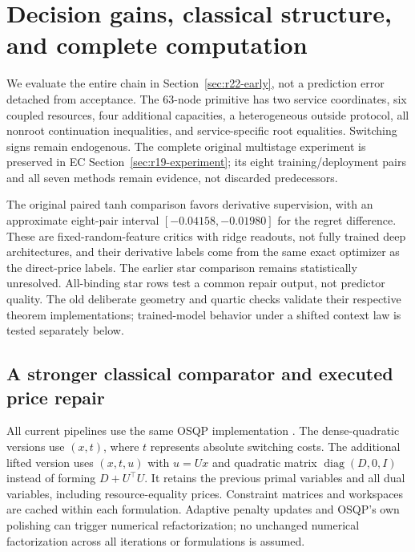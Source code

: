 \documentclass[11pt,letterpaper]{article}
\theoremstyle{definition}
\newcommand{\1}{\mathbf 1}
\begin{document}
\section{Decision gains, classical structure, and complete computation}\label{sec:r22-empirical}
We evaluate the entire chain in Section~\ref{sec:r22-early}, not a prediction error detached from acceptance. The 63-node primitive has two service coordinates, six coupled resources, four additional capacities, a heterogeneous outside protocol, all nonroot continuation inequalities, and service-specific root equalities. Switching signs remain endogenous. The complete original multistage experiment is preserved in EC Section~\ref{sec:r19-experiment}; its eight training/deployment pairs and all seven methods remain evidence, not discarded predecessors.

The original paired tanh comparison favors derivative supervision, with an approximate eight-pair interval $[-0.04158,-0.01980]$ for the regret difference. These are fixed-random-feature critics with ridge readouts, not fully trained deep architectures, and their derivative labels come from the same exact optimizer as the direct-price labels. The earlier star comparison remains statistically unresolved. All-binding star rows test a common repair output, not predictor quality. The old deliberate geometry and quartic checks validate their respective theorem implementations; trained-model behavior under a shifted context law is tested separately below.

\subsection{A stronger classical comparator and executed price repair}
All current pipelines use the same OSQP implementation \citep{Stellato2020}. The dense-quadratic versions use $(x,t)$, where $t$ represents absolute switching costs. The additional lifted version uses $(x,t,u)$ with $u=Ux$ and quadratic matrix $\operatorname{diag}(D,0,I)$ instead of forming $D+U^\top U$. It retains the previous primal variables and all dual variables, including resource-equality prices. Constraint matrices and workspaces are cached within each formulation. Adaptive penalty updates and OSQP's own polishing can trigger numerical refactorization; no unchanged numerical factorization across all iterations or formulations is assumed.
\end{document}
